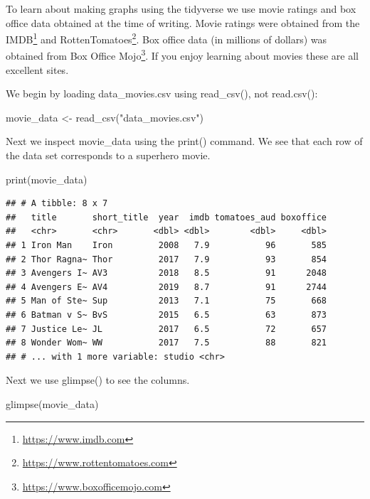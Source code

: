 \documentclass[
]{krantz}
\makeatletter
\newenvironment{Shaded}{\begin{snugshade}}{\end{snugshade}}
\newcommand{\FunctionTok}[1]{\textcolor[rgb]{0,0,0}{#1}}
\newcommand{\NormalTok}[1]{#1}
\newcommand{\OtherTok}[1]{\textcolor[rgb]{0.37,0.37,0.37}{#1}}
\newcommand{\StringTok}[1]{\textcolor[rgb]{0.5,0.5,0.5}{#1}}
\renewcommand{\href}[2]{#2\footnote{\url{#1}}}
\newenvironment{kframe}{%
\medskip{}
\setlength{\fboxsep}{.8em}
 \def\at@end@of@kframe{}%
 \ifinner\ifhmode%
  \def\at@end@of@kframe{\end{minipage}}%
  \begin{minipage}{\columnwidth}%
 \fi\fi%
 \def\FrameCommand##1{\hskip\@totalleftmargin \hskip-\fboxsep
 \colorbox{shadecolor}{##1}\hskip-\fboxsep
     \hskip-\linewidth \hskip-\@totalleftmargin \hskip\columnwidth}%
 \MakeFramed {\advance\hsize-\width
   \@totalleftmargin\z@ \linewidth\hsize
   \@setminipage}}%
 {\par\unskip\endMakeFramed%
 \at@end@of@kframe}
\renewenvironment{Shaded}{\begin{kframe}}{\end{kframe}}
\makeatother
\begin{document}
To learn about making graphs using the tidyverse we use movie ratings and box office data obtained at the time of writing. Movie ratings were obtained from the \href{https://www.imdb.com}{IMDB} and \href{https://www.rottentomatoes.com}{RottenTomatoes}. Box office data (in millions of dollars) was obtained from \href{https://www.boxofficemojo.com}{Box Office Mojo}. If you enjoy learning about movies these are all excellent sites.

We begin by loading data\_movies.csv using read\_csv(), not read.csv():

\begin{Shaded}
\begin{Highlighting}[]
\NormalTok{movie\_data }\OtherTok{\textless{}{-}} \FunctionTok{read\_csv}\NormalTok{(}\StringTok{"data\_movies.csv"}\NormalTok{)}
\end{Highlighting}
\end{Shaded}

Next we inspect movie\_data using the print() command. We see that each row of the data set corresponds to a superhero movie.

\begin{Shaded}
\begin{Highlighting}[]
\FunctionTok{print}\NormalTok{(movie\_data)}
\end{Highlighting}
\end{Shaded}

\begin{verbatim}
## # A tibble: 8 x 7
##   title       short_title  year  imdb tomatoes_aud boxoffice
##   <chr>       <chr>       <dbl> <dbl>        <dbl>     <dbl>
## 1 Iron Man    Iron         2008   7.9           96       585
## 2 Thor Ragna~ Thor         2017   7.9           93       854
## 3 Avengers I~ AV3          2018   8.5           91      2048
## 4 Avengers E~ AV4          2019   8.7           91      2744
## 5 Man of Ste~ Sup          2013   7.1           75       668
## 6 Batman v S~ BvS          2015   6.5           63       873
## 7 Justice Le~ JL           2017   6.5           72       657
## 8 Wonder Wom~ WW           2017   7.5           88       821
## # ... with 1 more variable: studio <chr>
\end{verbatim}

Next we use glimpse() to see the columns.

\begin{Shaded}
\begin{Highlighting}[]
\FunctionTok{glimpse}\NormalTok{(movie\_data)}
\end{Highlighting}
\end{Shaded}
\end{document}
